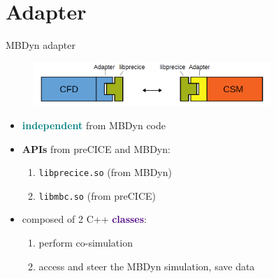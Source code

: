 \documentclass[10pt,t]{beamer}
\begin{document}
\section{Adapter}

\begin{frame}{MBDyn adapter}
    \begin{figure}
        \centering
        \includegraphics[width=0.8\textwidth]{images/adapter_scheme.png}
    \end{figure}
    
    \vspace{3mm}
    
    \begin{itemize}
     \itemsep 8pt
        \item \textcolor{teal}{\textbf{independent}} from MBDyn code
        \item \textcolor{dblue}{\textbf{APIs}} from preCICE and MBDyn:
        \begin{enumerate}
            \itemsep 5pt
            \item \texttt{libprecice.so}   \hspace{0.6cm} (from MBDyn)
            \item \texttt{libmbc.so}       \hspace{1.27cm}    (from preCICE)
        \end{enumerate}
        
        \item composed of 2 C++ \textcolor{indigo}{\textbf{classes}}:
        \begin{enumerate}
            \itemsep 5pt
            \item perform co-simulation
            \item access and steer the MBDyn simulation, save data
        \end{enumerate}
        
    \end{itemize}
\end{frame}
\end{document}
